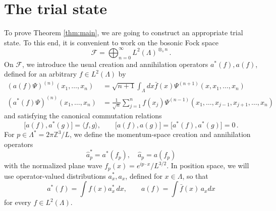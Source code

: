 \documentclass[a4paper,11pt]{article}
\def\bZ{\mathbb{Z}}
\def\cF{\mathcal{F}}
\numberwithin{equation}{section}
\begin{document}
\section{The trial state}

To prove Theorem \ref{thm:main}, we are going to construct an appropriate trial state. To this end, it is convenient to work on the bosonic Fock space
\[ \cF = \bigoplus_{n=0}^\infty L^2 (\Lambda)^{\otimes_s n} \, . \]
On $\cF$, we introduce the usual creation and annihilation operators $a^* (f), a(f)$, defined for an arbitrary $f \in L^2 (\Lambda)$ by 
\[ \begin{split} (a (f) \Psi)^{(n)}  (x_1, \dots , x_n) &= \sqrt{n+1} \int_{\Lambda}  dx \bar{f} (x) \Psi^{(n+1)} (x, x_1, \dots , x_n) \\ 
(a^* (f) \Psi)^{(n)} (x_1, \dots, x_n) &= \frac{1}{\sqrt{n}} \sum_{j=1}^n f (x_j) \Psi^{(n-1)} (x_1, \dots , x_{j-1}, x_{j+1}, \dots , x_n)  \end{split} \]
and satisfying the canonical commutation relations 
\begin{equation*}\label{eq:CCR} 
\big[ a (f) , a^* (g) \big] = \langle f , g \rangle , \qquad \big[ a (f) , a(g) \big] = \big[ a^* (f) , a^* (g) \big] = 0  \,.
\end{equation*} 
For $p \in \Lambda^* = 2\pi \bZ^3/L$, we define the momentum-space creation and annihilation operators 
\[ \hat{a}_p^* = a^* (f_p), \quad \hat{a}_p = a (f_p) \]
with the normalized plane wave $f_p (x) = e^{ip\cdot x} / L^{3/2}$. In position space, we will use  operator-valued distributions $a_x^* , a_x$, defined for $x \in \Lambda$, so that 
\[ a^* (f) = \int f (x) a^*_x \, dx , \qquad a (f) = \int \bar{f} (x) \, a_x dx \]
for every $f \in L^2 (\Lambda)$. 
\end{document}
